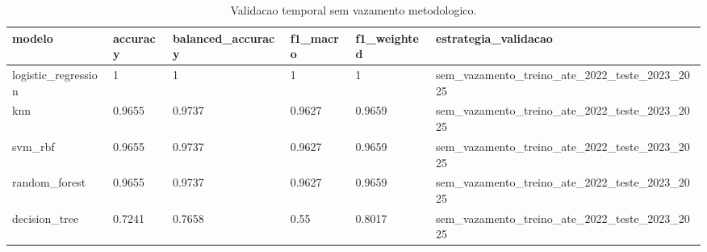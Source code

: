 \begin{table}[htbp]
\centering
\caption{Validacao temporal sem vazamento metodologico.}
\label{tab:validacao-sem-vazamento}
\begin{tabular}{llllll}
\hline
modelo & accuracy & balanced\_accuracy & f1\_macro & f1\_weighted & estrategia\_validacao \\
\hline
logistic\_regression & 1 & 1 & 1 & 1 & sem\_vazamento\_treino\_ate\_2022\_teste\_2023\_2025 \\
knn & 0.9655 & 0.9737 & 0.9627 & 0.9659 & sem\_vazamento\_treino\_ate\_2022\_teste\_2023\_2025 \\
svm\_rbf & 0.9655 & 0.9737 & 0.9627 & 0.9659 & sem\_vazamento\_treino\_ate\_2022\_teste\_2023\_2025 \\
random\_forest & 0.9655 & 0.9737 & 0.9627 & 0.9659 & sem\_vazamento\_treino\_ate\_2022\_teste\_2023\_2025 \\
decision\_tree & 0.7241 & 0.7658 & 0.55 & 0.8017 & sem\_vazamento\_treino\_ate\_2022\_teste\_2023\_2025 \\
\hline
\end{tabular}
\end{table}
